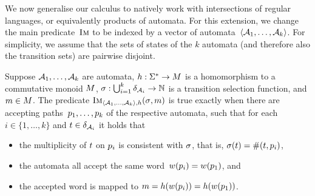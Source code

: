 
We now generalise our calculus to natively work with intersections of
regular languages, or equivalently products of automata. For this
extension, we change the main predicate~$\operatorname{\textsc{Im}}$ to be indexed by a
vector of automata~$\left\langle\mathcal{A}_1, \ldots, \mathcal{A}_k\right\rangle$.  For
simplicity, we assume that the sets of states of the $k$ automata (and
therefore also the transition sets) are pairwise disjoint. 
\begin{definition}\label{def:multiple}
  Suppose $\mathcal{A}_1, \ldots, \mathcal{A}_k$ are automata,
  $h : \Sigma^* \to M$ is a homomorphism to a commutative monoid
  $M$,
  $\operatorname{\sigma}: \bigcup_{i=1}^k \delta_{\mathcal{A}_i} \to \mathbb{N}$
  is a transition selection function, and
  $m \in M$. The predicate
  $\operatorname{\textsc{Im}}_{\left\langle\mathcal{A}_1, \ldots,
      \mathcal{A}_k\right\rangle, h}(\operatorname{\sigma}, m)$ is true exactly
  when there are accepting paths~$p_1, \ldots, p_k$ of the
  respective automata, such that for each $i \in \{1, \ldots, k\}$ and
  $t \in \delta_{\mathcal{A}_i}$ it holds that
  \begin{itemize}
  \item the multiplicity of $t$ on $p_i$ is consistent with
    $\operatorname{\sigma}$, that is,
    $\operatorname{\sigma}(t) = \operatorname{\#}(t, p_i)$,
  \item the automata all accept the same
    word~$w(p_i) = w(p_1)$, and
  \item the accepted word is mapped to
    $m = h(w(p_i)) =
    h(w(p_1))$.
  \end{itemize}
\end{definition}

